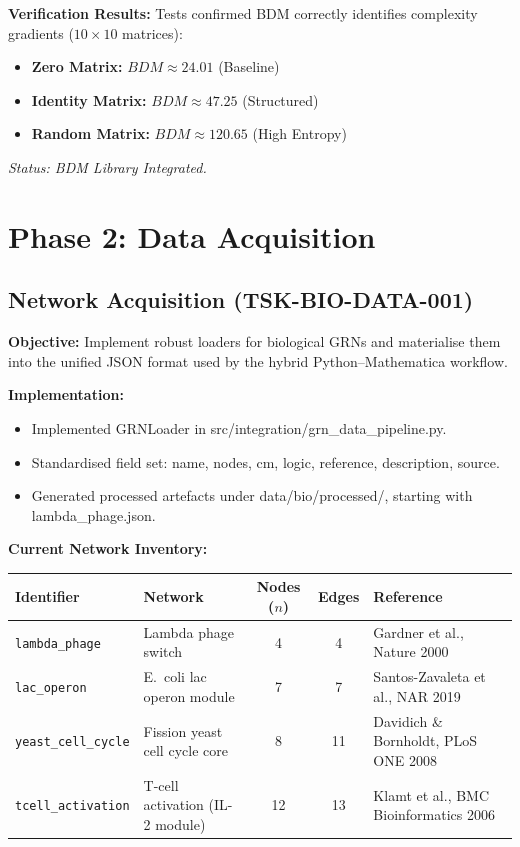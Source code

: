 \documentclass{article}
\begin{document}
\textbf{Verification Results:}
Tests confirmed BDM correctly identifies complexity gradients ($10 \times 10$ matrices):
\begin{itemize}
    \item \textbf{Zero Matrix:} $BDM \approx 24.01$ (Baseline)
    \item \textbf{Identity Matrix:} $BDM \approx 47.25$ (Structured)
    \item \textbf{Random Matrix:} $BDM \approx 120.65$ (High Entropy)
\end{itemize}
\textit{Status: BDM Library Integrated.}

\section{Phase 2: Data Acquisition}

\subsection{Network Acquisition (TSK-BIO-DATA-001)}
\textbf{Objective:} Implement robust loaders for biological GRNs and materialise them into the unified JSON format used by the hybrid Python–Mathematica workflow.

\textbf{Implementation:}
\begin{itemize}
    \item Implemented GRNLoader in src/integration/grn\_data\_pipeline.py.
    \item Standardised field set: name, nodes, cm, logic, reference, description, source.
    \item Generated processed artefacts under data/bio/processed/, starting with lambda\_phage.json.
\end{itemize}

\textbf{Current Network Inventory:}
\begin{center}
\begin{tabular}{l l c c l}
\hline
Identifier & Network & Nodes ($n$) & Edges & Reference \\
\hline
\texttt{lambda\_phage} & Lambda phage switch & 4 & 4 & Gardner et al., Nature 2000 \\
\texttt{lac\_operon} & E.~coli lac operon module & 7 & 7 & Santos-Zavaleta et al., NAR 2019 \\
\texttt{yeast\_cell\_cycle} & Fission yeast cell cycle core & 8 & 11 & Davidich \& Bornholdt, PLoS ONE 2008 \\
\texttt{tcell\_activation} & T-cell activation (IL-2 module) & 12 & 13 & Klamt et al., BMC Bioinformatics 2006 \\
\hline
\end{tabular}
\end{center}
\end{document}
